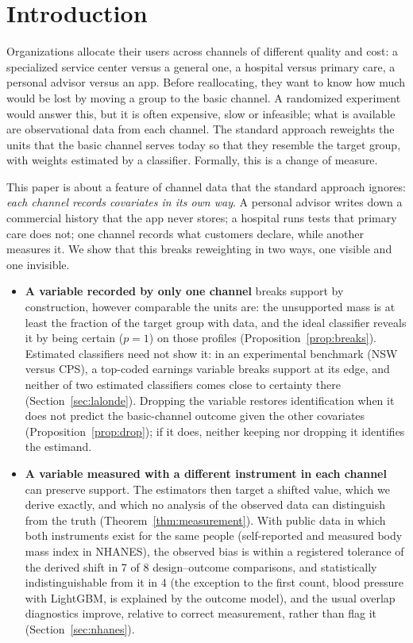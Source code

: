 \section{Introduction}\label{sec:intro}

Organizations allocate their users across channels of different quality and cost: a specialized service center versus a general one, a hospital versus primary care, a personal advisor versus an app. Before reallocating, they want to know how much would be lost by moving a group to the basic channel. A randomized experiment would answer this, but it is often expensive, slow or infeasible; what is available are observational data from each channel. The standard approach reweights the units that the basic channel serves today so that they resemble the target group, with weights estimated by a classifier. Formally, this is a change of measure.

This paper is about a feature of channel data that the standard approach ignores: \emph{each channel records covariates in its own way}. A personal advisor writes down a commercial history that the app never stores; a hospital runs tests that primary care does not; one channel records what customers declare, while another measures it. We show that this breaks reweighting in two ways, one visible and one invisible.
\begin{itemize}
  \item \textbf{A variable recorded by only one channel} breaks support by construction, however comparable the units are: the unsupported mass is at least the fraction of the target group with data, and the ideal classifier reveals it by being certain ($p=1$) on those profiles (Proposition~\ref{prop:breaks}). Estimated classifiers need not show it: in an experimental benchmark (NSW versus CPS), a top-coded earnings variable breaks support at its edge, and neither of two estimated classifiers comes close to certainty there (Section~\ref{sec:lalonde}). Dropping the variable restores identification when it does not predict the basic-channel outcome given the other covariates (Proposition~\ref{prop:drop}); if it does, neither keeping nor dropping it identifies the estimand.
  \item \textbf{A variable measured with a different instrument in each channel} can preserve support. The estimators then target a shifted value, which we derive exactly, and which no analysis of the observed data can distinguish from the truth (Theorem~\ref{thm:measurement}). With public data in which both instruments exist for the same people (self-reported and measured body mass index in NHANES), the observed bias is within a registered tolerance of the derived shift in 7 of 8 design--outcome comparisons, and statistically indistinguishable from it in 4 (the exception to the first count, blood pressure with LightGBM, is explained by the outcome model), and the usual overlap diagnostics improve, relative to correct measurement, rather than flag it (Section~\ref{sec:nhanes}).
\end{itemize}

